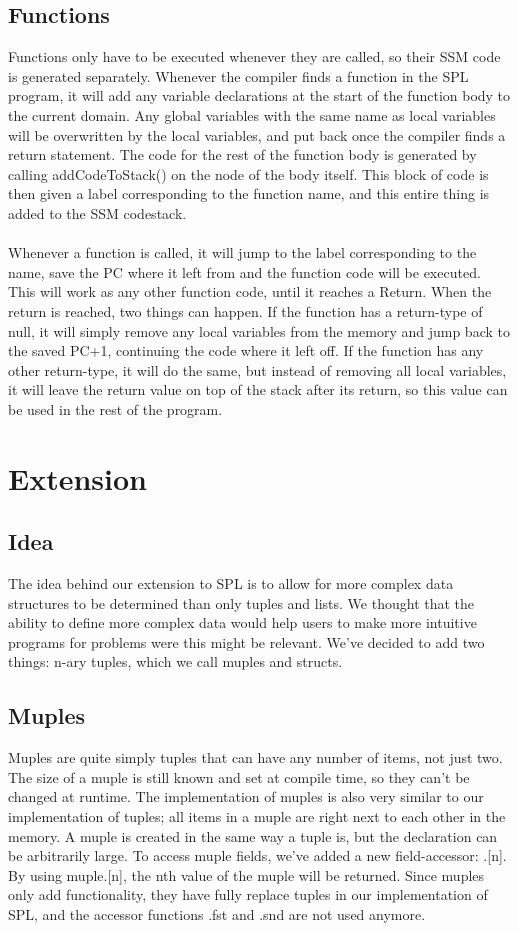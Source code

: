 \documentclass[10pt,a4paper]{article}
\begin{document}
\subsection{Functions}
Functions only have to be executed whenever they are called, so their SSM code is generated separately. Whenever the compiler finds a function in the SPL program, it will add any variable declarations at the start of the function body to the current domain. Any global variables with the same name as local variables will be overwritten by the local variables, and put back once the compiler finds a return statement. The code for the rest of the function body is generated by calling addCodeToStack() on the node of the body itself. This block of code is then given a label corresponding to the function name, and this entire thing is added to the SSM codestack.\\
\\
Whenever a function is called, it will jump to the label corresponding to the name, save the PC where it left from and the function code will be executed. This will work as any other function code, until it reaches a Return. When the return is reached, two things can happen. If the function has a return-type of null, it will simply remove any local variables from the memory and jump back to the saved PC+1, continuing the code where it left off. If the function has any other return-type, it will do the same, but instead of removing all local variables, it will leave the return value on top of the stack after its return, so this value can be used in the rest of the program.


\section{Extension}
\subsection{Idea}
The idea behind our extension to SPL is to allow for more complex data structures to be determined than only tuples and lists. We thought that the ability to define more complex data would help users to make more intuitive programs for problems were this might be relevant. We've decided to add two things: n-ary tuples, which we call muples and structs. 
\subsection{Muples}
Muples are quite simply tuples that can have any number of items, not just two. The size of a muple is still known and set at compile time, so they can't be changed at runtime. The implementation of muples is also very similar to our implementation of tuples; all items in a muple are right next to each other in the memory. A muple is created in the same way a tuple is, but the declaration can be arbitrarily large. To access muple fields, we've added a new field-accessor: .[n]. By using muple.[n], the nth value of the muple will be returned. Since muples only add functionality, they have fully replace tuples in our implementation of SPL, and the accessor functions .fst and .snd are not used anymore.
\end{document}
